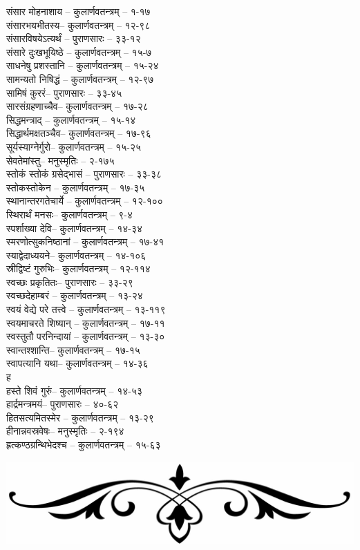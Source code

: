\begin{raggedright}
\begin{parcolumns}[colwidths={1=.55\textwidth,2=.55\textwidth}]{2}
{संसार मोहनाशाय	– 	कुलार्णवतन्त्रम्  – १-१७\\
संसारभयभीतस्य– 	कुलार्णवतन्त्रम्  – १२-९८\\
संसारविषयेऽत्यर्थं	– 	पुराणसारः   – ३३-१२	\\
संसारे दुःखभूयिष्ठे	– 	कुलार्णवतन्त्रम्  – १५-७\\
साधनेषु प्रशस्तानि	– 	कुलार्णवतन्त्रम्  – १५-२४\\
सामन्यतो निषिद्धं	– 	कुलार्णवतन्त्रम्  – १२-९७\\
सामिषं कुररं– 	पुराणसारः   – ३३-४५\\
सारसंग्रहणाच्चैव– 	 कुलार्णवतन्त्रम्  – १७-२८\\
सिद्धमन्त्राद्	– 	कुलार्णवतन्त्रम्  – १५-१४\\
सिद्धार्थमक्षतञ्चैव– 	 कुलार्णवतन्त्रम्  – १७-९६\\
सूर्यस्याग्नेर्गुरो– 	कुलार्णवतन्त्रम्  – १५-२५\\
सेवतेमांस्तु– 	मनुस्मृतिः  – २-१७५\\
स्तोकं स्तोकं ग्रसेद्भासं	– 	पुराणसारः   – ३३-३८	\\
स्तोकस्तोकेन	– 	 कुलार्णवतन्त्रम्  – १७-३५\\
स्थानान्तरगतेचार्ये	– 	कुलार्णवतन्त्रम्  – १२-१००\\
स्थिरार्थं मनसः– 	कुलार्णवतन्त्रम्  – ९-४\\
स्पर्शाख्या देवि– 	 कुलार्णवतन्त्रम्  – १४-३४\\
स्मरणोत्सुकनिष्ठानां	– 	कुलार्णवतन्त्रम्  – १७-४१	\\
स्याद्वेदाध्ययने– 	कुलार्णवतन्त्रम्  – १४-१०६\\
स्रीद्विष्टं गुरुभिः– 	कुलार्णवतन्त्रम्  – १२-११४\\
स्वच्छः प्रकृतितः– 	पुराणसारः   – ३३-२९	\\
स्वच्छदेहाम्बरं – कुलार्णवतन्त्रम्  – १३-२४\\
स्वयं वेद्ये परे तत्त्वे	– 	कुलार्णवतन्त्रम्  – १३-११९\\
स्वयमाचरते शिष्यान्	– 	कुलार्णवतन्त्रम्  – १७-११	\\
स्वस्तुतौ परनिन्दायां	– 	कुलार्णवतन्त्रम्  – १३-३०\\
स्वान्तश्शान्ति– 	कुलार्णवतन्त्रम्  – १७-१५\\
स्वापत्यानि यथा– 	कुलार्णवतन्त्रम्  – १४-३६\\
{\large ह}\\
हस्ते शिवं गुरुं– 	कुलार्णवतन्त्रम्  – १४-५३\\
हार्द्रमन्त्रमयं– 	पुराणसारः   – ४०-६२\\
हितसत्यमितस्मेर	– 	कुलार्णवतन्त्रम्  – १३-२९\\
हीनान्नवस्रवेषः– 	मनुस्मृतिः  – २-१९४\\
ह्रत्कण्ठग्रन्थिभेदश्च	– 	कुलार्णवतन्त्रम्  – १५-६३
}
\end{parcolumns}
\end{raggedright}
\begin{center}\includegraphics[scale=0.08]{end}\end{center}
